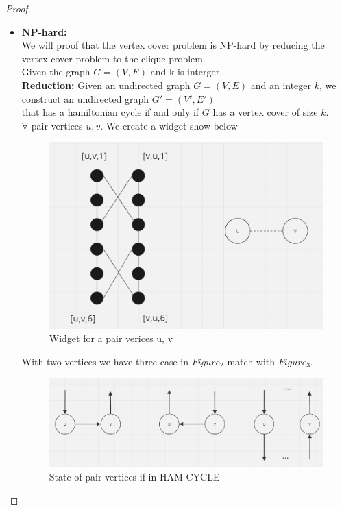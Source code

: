 \documentclass{article}
\begin{document}
\begin{proof}
\begin{itemize}
        \item \textbf{NP-hard:} \\
        We will proof that the vertex cover problem is NP-hard by reducing the vertex cover problem to the clique problem.\\
        Given the graph $G = (V,E)$ and k is interger.\\
        \textbf{Reduction:} Given an undirected graph $G = (V,E)$ and an integer $k$, we construct an undirected graph $G' = (V',E')$ \\
        that has a hamiltonian cycle if and only if $G$ has a vertex cover of size $k$.\\
        $\forall$ pair vertices $u, v$. We create a widget show below
        \begin{figure}
            \includegraphics[width=\linewidth]{Figure_1.png}
            \caption{Widget for a pair verices u, v}
            \label{fig:1}
        \end{figure}
        With two vertices we have three case in $Figure_2$ match with $Figure_3$.
        \begin{figure}
            \includegraphics[width=\linewidth]{Figure_2.png}
            \caption{State of pair vertices if in HAM-CYCLE}
            \label{fig:2}

\end{figure}
\end{itemize}
\end{proof}
\end{document}
